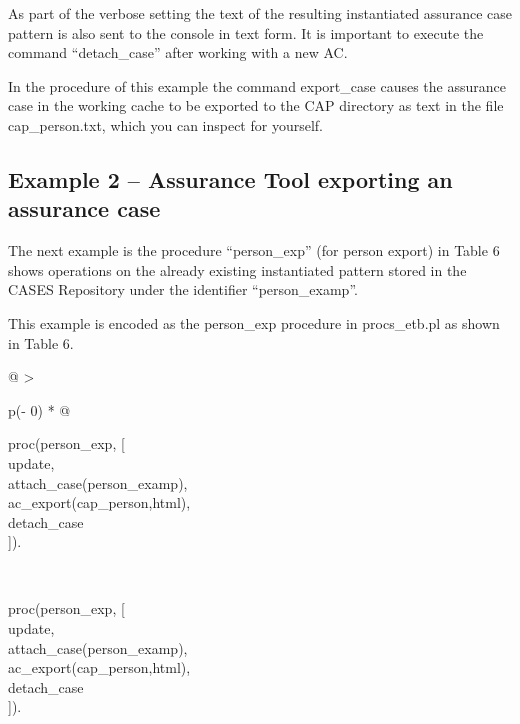 \documentclass[12pt,twoside,a4paper]{article}
\begin{document}
As part of the verbose setting the text of the resulting instantiated assurance case pattern is also sent to the console in text form. It is important to execute the command ``detach\_case'' after working with a new AC.

In the procedure of this example the command export\_case causes the assurance case in the working cache to be exported to the CAP directory as text in the file cap\_person.txt, which you can inspect for yourself.

\hypertarget{example-2-assurance-tool-exporting-an-assurance-case}{%
\subsection{Example 2 -- Assurance Tool exporting an assurance case}\label{example-2-assurance-tool-exporting-an-assurance-case}}

The next example is the procedure ``person\_exp'' (for person export) in Table 6 shows operations on the already existing instantiated pattern stored in the CASES Repository under the identifier ``person\_examp''.

This example is encoded as the person\_exp procedure in procs\_etb.pl as shown in Table 6.

\begin{longtable}[]{@{}
  >{\raggedright\arraybackslash}p{(\columnwidth - 0\tabcolsep) * }@{}}
\caption{\protect\hypertarget{_Ref168411722}{}{}Table Example 2 -- exporting an assurance case as HTML}\tabularnewline
\toprule
\begin{minipage}[b]{\linewidth}\raggedright
proc(person\_exp, {[}\\
update,\\
attach\_case(person\_examp),\\
ac\_export(cap\_person,html),\\
detach\_case\\
{]}).\strut
\end{minipage} \\
\midrule
\endfirsthead
\toprule
\begin{minipage}[b]{\linewidth}\raggedright
proc(person\_exp, {[}\\
update,\\
attach\_case(person\_examp),\\
ac\_export(cap\_person,html),\\
detach\_case\\
{]}).\strut
\end{minipage} \\
\midrule
\endhead
\bottomrule
\end{longtable}
\end{document}

